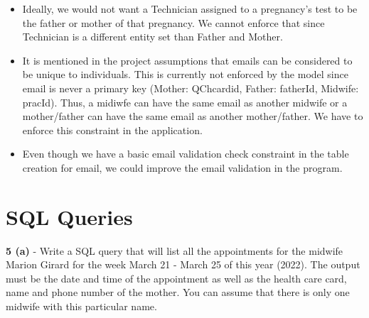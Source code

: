 \documentclass[10pt, letterpaper]{article}
\begin{document}
\begin{itemize}
    \item Ideally, we would not want a Technician assigned to a pregnancy's test to be the father or mother of that pregnancy. We cannot enforce that since Technician is a different entity set than Father and Mother.
    \item It is mentioned in the project assumptions that emails can be considered to be unique to individuals. This is currently not enforced by the model since email is never a primary key (Mother: QChcardid, Father: fatherId, Midwife: pracId). Thus, a midiwfe can have the same email as another midwife or a mother/father can have the same email as another mother/father. We have to enforce this constraint in the application.
    \item Even though we have a basic email validation check constraint in the table creation for email, we could improve the email validation in the program.
\end{itemize}

\lstset{basicstyle=\ttfamily\normalsize,breaklines=true}
\section{SQL Queries}
\textbf{5 (a)} - Write a SQL query that will list all the appointments for the midwife Marion Girard for the week March
21 - March 25 of this year (2022). The output must be the date and time of the appointment as well
as the health care card, name and phone number of the mother. You can assume that there is only one
midwife with this particular name.
\end{document}
